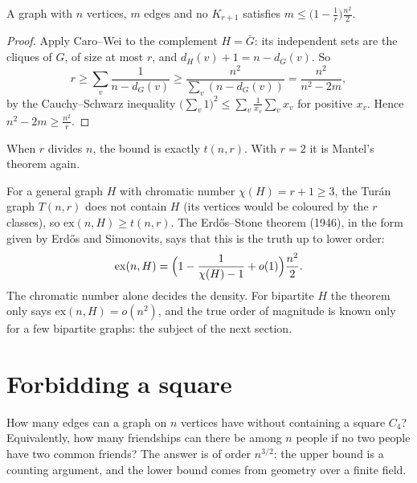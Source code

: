 \begin{proposition}\label{extremal:prop:turanprob}
A graph with $n$ vertices, $m$ edges and no $K_{r+1}$ satisfies $m\le\bigl(1-\frac1r\bigr)\frac{n^2}2$.
\end{proposition}
\begin{proof}
Apply Caro--Wei to the complement $H=\bar G$: its independent sets are the cliques of $G$, of size at most $r$, and $d_H(v)+1=n-d_G(v)$. So
\[
r\ge\sum_v\frac1{n-d_G(v)}\ge\frac{n^2}{\sum_v(n-d_G(v))}=\frac{n^2}{n^2-2m},
\]
by the Cauchy--Schwarz inequality $\bigl(\sum_v1\bigr)^2\le\sum_v\frac1{x_v}\sum_vx_v$ for positive $x_v$. Hence $n^2-2m\ge\frac{n^2}r$.
\end{proof}

When $r$ divides $n$, the bound is exactly $t(n,r)$. With $r=2$ it is Mantel's theorem again.

\begin{remark}
For a general graph $H$ with chromatic number $\chi(H)=r+1\ge3$, the Tur\'an graph $T(n,r)$ does not contain $H$ (its vertices would be coloured by the
$r$ classes), so $\mathrm{ex}(n,H)\ge t(n,r)$. The Erd\H os--Stone theorem (1946), in the form given by Erd\H os and Simonovits, says that this is the truth
up to lower order:
\[
\mathrm{ex}(n,H)=\Bigl(1-\frac1{\chi(H)-1}+o(1)\Bigr)\frac{n^2}2.
\]
The chromatic number alone decides the density. For bipartite $H$ the theorem only says $\mathrm{ex}(n,H)=o(n^2)$, and the true order of magnitude is
known only for a few bipartite graphs: the subject of the next section.
\end{remark}

\section{Forbidding a square}

How many edges can a graph on $n$ vertices have without containing a square $C_4$? Equivalently, how many friendships can there be among $n$
people if no two people have two common friends? The answer is of order $n^{3/2}$: the upper bound is a counting argument, and the lower bound comes
from geometry over a finite field.

